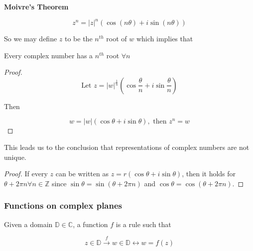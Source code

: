 \documentclass[10pt]{article}
\begin{document}
\begin{theorem}
	\textbf{Moivre's Theorem} 


	\begin{equation}
		z^n = |z|^n (\cos(n\theta) + i \sin(n\theta))
		\label{eq:389:moivre}
	\end{equation}

	So we may define $ z $ to be the $ n^{th} $ root of $ w $ which implies that 

	\begin{lemma}
		Every complex number has a $ n^{th} $ root $ \forall n $ 
	\end{lemma}

	\begin{proof}

		\begin{equation}
			\text{Let } z = |w|^{\frac{1}{n}}(\cos \frac{\theta}{n} + i \sin \frac{\theta}{n})
		\end{equation}

		Then

		\begin{equation}
			w = |w| (\cos \theta + i \sin \theta), \text{ then  } z^n = w
		\end{equation}
		
	\end{proof}
	
\end{theorem}

This leads us to the conclusion that representations of complex numbers are not unique.
\begin{proof}
	If every $ z $ can be written as $ z = r(\cos\theta + i \sin \theta)$, then it holds for $ \theta + 2\pi n \forall n \in \mathbb{Z} $ since $ \sin\theta = \sin(\theta + 2\pi n) $  and  $  \cos\theta = \cos(\theta + 2\pi n)  $.
\end{proof}

\subsubsection{Functions on complex planes}


\begin{definition}
	Given a domain $ \mathbb{D} \in \mathbb{C} $, a function $ f $  is a rule such that

	\begin{equation}
		z \in \mathbb{D} \xrightarrow{f} w \in \mathbb{D} \leftrightarrow w = f(z)
	\end{equation}
\end{definition}
\end{document}
